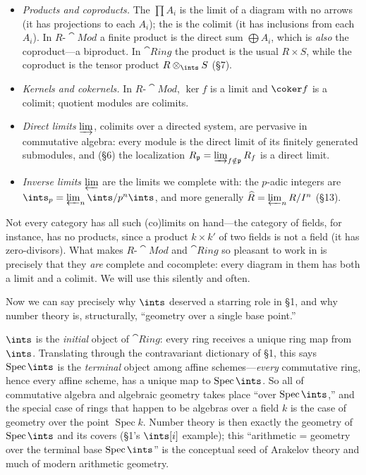 \documentclass[11pt]{article}
\DeclareMathOperator{\Spec}{Spec}
\newcommand{\mfp}{\mathfrak{p}}
\newcommand{\dirlim}{\varinjlim}
\newcommand{\invlim}{\varprojlim}
\begin{document}
\begin{eexample}
\begin{itemize}\setlength{\itemsep}{2pt}
\item \emph{Products and coproducts.} The  $\prod A_i$ is the limit of a
diagram with no arrows (it has projections to each $A_i$); the  is the
colimit (it has inclusions from each $A_i$). In $R\text{-}\cat{Mod}$ a finite product is the
direct sum $\bigoplus A_i$, which is \emph{also} the coproduct---a biproduct. In $\cat{Ring}$
the product is the usual $R\times S$, while the coproduct is the tensor product
$R\otimes_\ints S$ (\S7).
\item \emph{Kernels and cokernels.} In $R\text{-}\cat{Mod}$, $\ker f$ is a limit and
$\coker f$ is a colimit; quotient modules are colimits.
\item \emph{Direct limits} $\dirlim$, colimits over a directed system, are pervasive in
commutative algebra: every module is the direct limit of its finitely generated submodules,
and (\S6) the localization $R_\mfp=\dirlim_{f\notin\mfp}R_f$ is a direct limit.
\item \emph{Inverse limits} $\invlim$ are the limits we complete with: the $p$-adic integers
are $\ints_p=\invlim_n \ints/p^n\ints$, and more generally $\widehat{R}=\invlim_n R/I^n$
(\S13).
\end{itemize}
\end{eexample}

\noindent
Not every category has all such (co)limits on hand---the category of fields, for instance, has
no products, since a product $k\times k'$ of two fields is not a field (it has zero-divisors).
What makes $R\text{-}\cat{Mod}$ and $\cat{Ring}$ so pleasant to work in is precisely that they
\emph{are} complete and cocomplete: every diagram in them has both a limit and a colimit. We
will use this silently and often.

Now we can say precisely why $\ints$ deserved a starring role in \S1, and why number theory
is, structurally, ``geometry over a single base point.''

\begin{iidea}[Why $\ints$ is special, and why everything lives over $\Spec\ints$]
$\ints$ is the \emph{initial} object of $\cat{Ring}$: every ring receives a unique ring map
from $\ints$. Translating through the contravariant dictionary of \S1, this says
$\Spec\ints$ is the \emph{terminal} object among affine schemes---\emph{every} commutative
ring, hence every affine scheme, has a unique map to $\Spec\ints$. So all of commutative
algebra and algebraic geometry takes place ``over $\Spec\ints$,'' and the special case of
rings that happen to be algebras over a field $k$ is the case of geometry over the point
$\Spec k$. Number theory is then exactly the geometry of $\Spec\ints$ and its covers (\S1's
$\ints[i]$ example); this ``arithmetic = geometry over the terminal base $\Spec\ints$'' is
the conceptual seed of Arakelov theory and much of modern arithmetic geometry.
\end{iidea}
\end{document}
